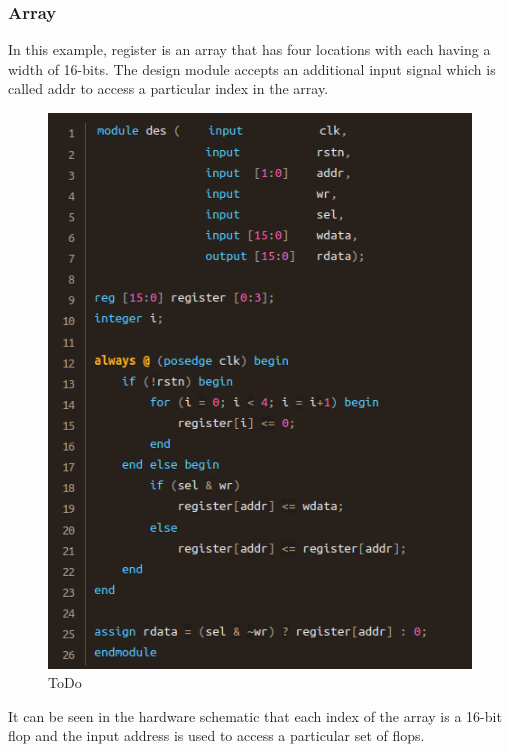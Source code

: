 \documentclass{article}
\begin{document}
	\subsubsection{Array}

	In this example, register is an array that has four locations with each having a width of 16-bits. The design module accepts an additional input signal which is called addr to access a particular
	index in the array.

	\begin{figure}[H]
		\includegraphics[width=\linewidth]{VerilogPics/figure_25.png}
		\caption{ToDo}
		\label{ToDo}
	\end{figure}

	It can be seen in the hardware schematic that each index of the array is a 16-bit flop and the input address is used to access a particular set of flops.
\end{document}
